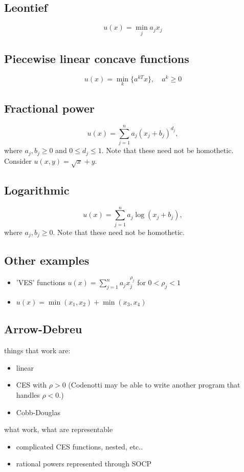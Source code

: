 \documentclass{article}
\begin{document}
\subsection{Leontief}
\[
u(x) = \min_j a_j x_j
\]

\subsection{Piecewise linear concave functions}
\[
u(x) = \min_k\lbrace a^{kT}x \rbrace,\quad a^k \geq 0
\]
\subsection{Fractional power}
 \[
 u(x) = \sum_{j=1}^n a_j (x_j+ b_j)^{d_j},
 \]
 where $a_j, b_j \geq 0$ and $0 \leq d_j \leq 1$.
 Note that these need not be homothetic. Consider $u(x,y) = \sqrt{x} + y$.

\subsection{Logarithmic}
\[
u(x) = \sum_{j=1}^n a_j \log(x_j+ b_j),
\]
where $a_j, b_j \geq 0$.  Note that these need not be homothetic.

\subsection{Other examples}
\begin{itemize}
\item 'VES' functions  $u(x) = \sum_{j=1}^{n} a_j x_j^{\rho_j}$ for $0 < \rho_j < 1$
\item $u(x) = \min(x_1,x_2) + \min(x_3,x_4)$
\end{itemize}




\subsection{Arrow-Debreu}
things that work are:
\begin{itemize}
\item linear
\item CES with $\rho > 0$ (Codenotti may be able to write another program that handles $\rho < 0$.)
\item Cobb-Douglas
\end{itemize}
what work, what are representable
\begin{itemize}
\item complicated CES functions, nested, etc..
\item rational powers represented through SOCP
\end{itemize}
\end{document}
